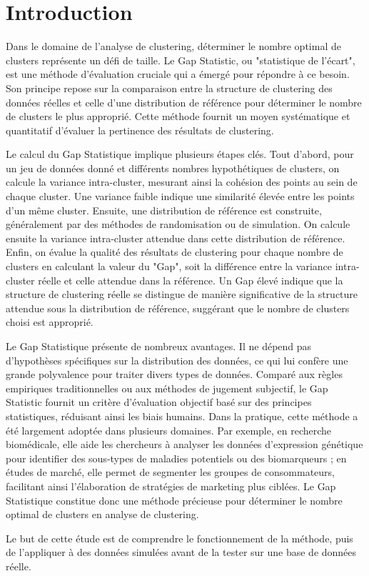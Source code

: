 \chapter*{Introduction}


Dans le domaine de l'analyse de clustering, déterminer le nombre optimal de clusters représente un défi de taille. Le Gap Statistic\cite{tibshirani_estimating_2001}, ou "statistique de l’écart", est une méthode d’évaluation cruciale qui a émergé pour répondre à ce besoin. Son principe repose sur la comparaison entre la structure de clustering des données réelles et celle d'une distribution de référence pour déterminer le nombre de clusters le plus approprié. Cette méthode fournit un moyen systématique et quantitatif d’évaluer la pertinence des résultats de clustering.

Le calcul du Gap Statistique implique plusieurs étapes clés. Tout d'abord, pour un jeu de données donné et différents nombres hypothétiques de clusters, on calcule la variance intra-cluster, mesurant ainsi la cohésion des points au sein de chaque cluster. Une variance faible indique une similarité élevée entre les points d'un même cluster. Ensuite, une distribution de référence est construite, généralement par des méthodes de randomisation ou de simulation. On calcule ensuite la variance intra-cluster attendue dans cette distribution de référence. Enfin, on évalue la qualité des résultats de clustering pour chaque nombre de clusters en calculant la valeur du "Gap", soit la différence entre la variance intra-cluster réelle et celle attendue dans la référence. Un Gap élevé indique que la structure de clustering réelle se distingue de manière significative de la structure attendue sous la distribution de référence, suggérant que le nombre de clusters choisi est approprié.

Le Gap Statistique présente de nombreux avantages. Il ne dépend pas d'hypothèses spécifiques sur la distribution des données, ce qui lui confère une grande polyvalence pour traiter divers types de données. Comparé aux règles empiriques traditionnelles ou aux méthodes de jugement subjectif, le Gap Statistic fournit un critère d'évaluation objectif basé sur des principes statistiques, réduisant ainsi les biais humains. Dans la pratique, cette méthode a été largement adoptée dans plusieurs domaines. Par exemple, en recherche biomédicale, elle aide les chercheurs à analyser les données d'expression génétique pour identifier des sous-types de maladies potentiels ou des biomarqueurs ; en études de marché, elle permet de segmenter les groupes de consommateurs, facilitant ainsi l’élaboration de stratégies de marketing plus ciblées. Le Gap Statistique constitue donc une méthode précieuse pour déterminer le nombre optimal de clusters en analyse de clustering.

Le but de cette étude est de comprendre le fonctionnement de la méthode, puis de l'appliquer à des données simulées avant de la tester sur une base de données réelle.


